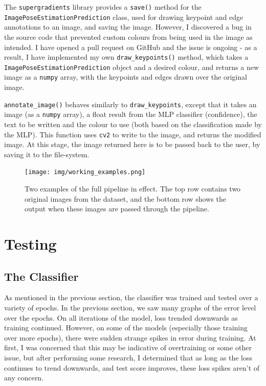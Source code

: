 \documentclass[a4paper, oneside, 11pt]{article}
\begin{document}
\bigskip
\noindent
The \texttt{supergradients} library provides a \texttt{save()} method for the \texttt{ImagePoseEstimationPrediction} class, used for drawing keypoint and edge annotations to an image, and saving the image. However, I discovered a bug in the source code that prevented custom colours from being used in the image as intended. I have opened a pull request on GitHub and the issue is ongoing - as a result, I have implemented my own \texttt{draw\_keypoints()} method, which takes a \texttt{ImagePoseEstimationPrediction} object and a desired colour, and returns a new image as a \texttt{numpy} array, with the keypoints and edges drawn over the original image.

\bigskip
\noindent
\texttt{annotate\_image()} behaves similarly to \texttt{draw\_keypoints}, except that it takes an image (as a \texttt{numpy} array), a float result from the MLP classifier (confidence), the text to be written and the colour to use (both based on the classification made by the MLP). This function uses \texttt{cv2} to write to the image, and returns the modified image. At this stage, the image returned here is to be passed back to the user, by saving it to the file-system.

\bigskip
\begin{figure}[ht]
    \centering
    \texttt{[image: img/working\_examples.png]}
    \caption{Two examples of the full pipeline in effect. The top row contains two original images from the dataset, and the bottom row shows the output when these images are passed through the pipeline.}
    \label{fig:working-examples}
\end{figure}


\newpage
\bigskip
\section{Testing}

\subsection{The Classifier}

As mentioned in the previous section, the classifier was trained and tested over a variety of epochs. In the previous section, we saw many graphs of the error level over the epochs. On all iterations of the model, loss trended downwards as training continued. However, on some of the models (especially those training over more epochs), there were sudden strange spikes in error during training. At first, I was concerned that this may be indicative of overtraining or some other issue, but after performing some research, I determined that as long as the loss continues to trend downwards, and test score improves, these loss spikes aren't of any concern.
\end{document}
